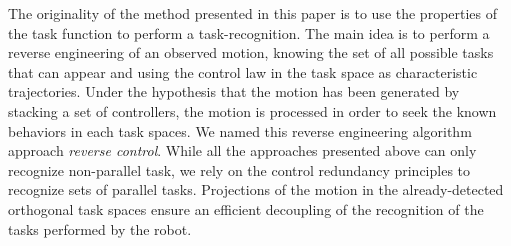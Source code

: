 \documentclass[journal]{IEEEtran}
\begin{document}
The originality of the method presented in this paper is to use the properties of the
task function to perform a task-recognition. The main idea is
to perform a reverse engineering of an observed motion, knowing the set of all possible tasks that can appear 
and using the control law in the task space as characteristic trajectories. 
Under the hypothesis that the motion has been generated by stacking a set of controllers,
the motion is processed in order to seek the known behaviors in each task spaces. 
We named this reverse engineering algorithm approach \emph{reverse control}.
While all the approaches presented above can only recognize non-parallel task,
we rely on the control redundancy principles to recognize sets of parallel tasks.
Projections of the motion in the already-detected orthogonal task spaces
ensure an efficient decoupling of the recognition of the tasks performed
by the robot.
%
%
\end{document}
